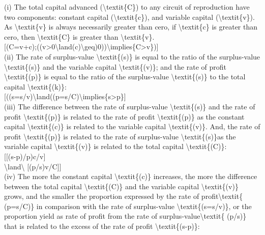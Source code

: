 \documentclass[
]{article}
\begin{document}
(i) The total capital advanced (\textbackslash textit\{C\}) to any
circuit of reproduction have two components: constant capital
(\textbackslash textit\{c\}), and variable capital
(\textbackslash textit\{v\}). As \textbackslash textit\{v\} is always
necessarily greater than cero, if \textbackslash textit\{c\} is greater
than cero, then \textbackslash textit\{C\} is greater than
\textbackslash textit\{v\}.\\
{[}(C=v+c);((v\textgreater0\textbackslash land(c)\textbackslash geq)0))\textbackslash implies\{C\textgreater v\}){]}\\
(ii) The rate of surplus-value
\textbackslash textit\{(s\textquotesingle)\} is equal to the ratio of
the surplus-value \textbackslash textit\{(s)\} and the variable capital
\textbackslash textit\{(v)\}; and the rate of profit
\textbackslash textit\{(p\textquotesingle)\} is equal to the ratio of
the surplus-value \textbackslash textit\{(s\textquotesingle)\} to the
total capital \textbackslash textit\{(k)\}:\\
{[}((s\textquotesingle=s/v)\textbackslash land((p\textquotesingle=s/C)\textbackslash implies\{s\textquotesingle\textgreater p\textquotesingle\}{]}\\
(iii) The difference between the rate of surplus-value
\textbackslash textit\{(s\textquotesingle)\} and the rate of profit
\textbackslash textit\{(p\textquotesingle)\} is related to the rate of
profit \textbackslash textit\{(p\textquotesingle)\} as the constant
capital \textbackslash textit\{(c)\} is related to the variable capital
\textbackslash textit\{(v)\}. And, the rate of profit
\textbackslash textit\{(p\textquotesingle)\} is related to the rate of
surplus-value \textbackslash textit\{(s\textquotesingle)\}as the
variable capital \textbackslash textit\{(v)\} is related to the total
capital \textbackslash textit\{(C)\}:\\
{[}{[}(s\textquotesingle-p\textquotesingle)/p\textquotesingle)\textbar c/v{]}\\
\textbackslash land\textbackslash{}
{[}(p\textquotesingle/s\textquotesingle)\textbar v/C{]}{]}\\
(iv) The more the constant capital \textbackslash textit\{(c)\}
increases, the more the difference between the total capital
\textbackslash textit\{(C)\} and the variable capital
\textbackslash textit\{(v)\} grows, and the smaller the proportion
expressed by the rate of profit\textbackslash textit\{
(p\textquotesingle=s/C)\} in comparison with the rate of surplus-value
\textbackslash textit\{(s\textquotesingle=s/v)\}, or the proportion
yield as rate of profit from the rate of
surplus-value\textbackslash textit\{
(p\textquotesingle/s\textquotesingle)\} that is related to the excess of
the rate of profit
\textbackslash textit\{(s\textquotesingle-p\textquotesingle)\}:
\end{document}
